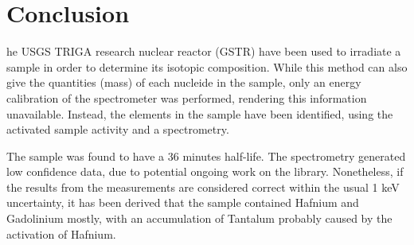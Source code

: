 %
%
\let\textcircled=\pgftextcircled
\chapter{Conclusion}
\label{chap:conclusion}

he USGS TRIGA research nuclear reactor (GSTR) have been used to irradiate a sample in order to determine its isotopic composition. While this method can also give the quantities (mass) of each nucleide in the sample, only an energy calibration of the spectrometer was performed, rendering this information unavailable. Instead, the elements in the sample have been identified, using the activated sample activity and a spectrometry.

The sample was found to have a 36 minutes half-life. The spectrometry generated low confidence data, due to potential ongoing work on the library. Nonetheless, if the results from the measurements are considered correct within the usual 1 keV uncertainty, it has been derived that the sample contained Hafnium and Gadolinium mostly, with an accumulation of Tantalum probably caused by the activation of Hafnium.



